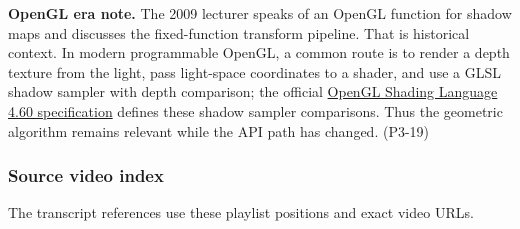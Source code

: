 \textbf{OpenGL era note.} The 2009 lecturer speaks of an OpenGL function for shadow maps and discusses the fixed-function transform pipeline. That is historical context. In modern programmable OpenGL, a common route is to render a depth texture from the light, pass light-space coordinates to a shader, and use a GLSL shadow sampler with depth comparison; the official \href{https://registry.khronos.org/OpenGL/specs/gl/GLSLangSpec.4.60.pdf}{OpenGL Shading Language 4.60 specification} defines these shadow sampler comparisons. Thus the geometric algorithm remains relevant while the API path has changed. (P3-19)

\subsubsection{Source video index}\label{03-visual-computing-i-ch011-source-video-index}

\hypertarget{03-visual-computing-i-ch011-source-video-index}{}

The transcript references use these playlist positions and exact video URLs.


